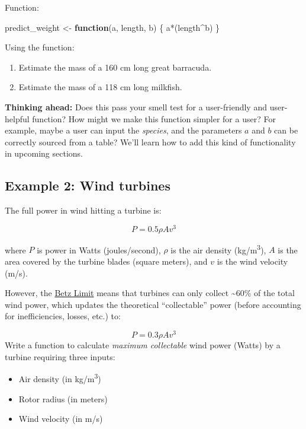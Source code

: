 \documentclass[
]{book}
\newenvironment{Shaded}{\begin{snugshade}}{\end{snugshade}}
\newcommand{\ControlFlowTok}[1]{\textcolor[rgb]{0.13,0.29,0.53}{\textbf{#1}}}
\newcommand{\NormalTok}[1]{#1}
\newcommand{\OtherTok}[1]{\textcolor[rgb]{0.56,0.35,0.01}{#1}}
\newcommand{\SpecialCharTok}[1]{\textcolor[rgb]{0.00,0.00,0.00}{#1}}
\providecommand{\tightlist}{%
  \setlength{\itemsep}{0pt}\setlength{\parskip}{0pt}}
\begin{document}
Function:

\begin{Shaded}
\begin{Highlighting}[]
\NormalTok{predict\_weight }\OtherTok{\textless{}{-}} \ControlFlowTok{function}\NormalTok{(a, length, b) \{}
\NormalTok{  a}\SpecialCharTok{*}\NormalTok{(length}\SpecialCharTok{\^{}}\NormalTok{b)}
\NormalTok{\}}
\end{Highlighting}
\end{Shaded}

Using the function:

\begin{enumerate}
\def\labelenumi{\arabic{enumi}.}
\tightlist
\item
  Estimate the mass of a 160 cm long great barracuda.
\item
  Estimate the mass of a 118 cm long milkfish.
\end{enumerate}

\textbf{Thinking ahead:} Does this pass your smell test for a user-friendly and user-helpful function? How might we make this function simpler for a user? For example, maybe a user can input the \emph{species}, and the parameters \(a\) and \(b\) can be correctly sourced from a table? We'll learn how to add this kind of functionality in upcoming sections.

\hypertarget{example-2-wind-turbines}{%
\subsection{Example 2: Wind turbines}\label{example-2-wind-turbines}}

The full power in wind hitting a turbine is:

\[P = 0.5\rho Av^3\]

where \(P\) is power in Watts (joules/second), \(\rho\) is the air density (kg/m\textsuperscript{3}), \(A\) is the area covered by the turbine blades (square meters), and \(v\) is the wind velocity (m/s).

However, the \href{https://energyeducation.ca/encyclopedia/Betz_limit}{Betz Limit} means that turbines can only collect \textasciitilde60\% of the total wind power, which updates the theoretical ``collectable'' power (before accounting for inefficiencies, losses, etc.) to:

\[P = 0.3\rho Av^3\]
Write a function to calculate \emph{maximum collectable} wind power (Watts) by a turbine requiring three inputs:

\begin{itemize}
\tightlist
\item
  Air density (in kg/m\textsuperscript{3})
\item
  Rotor radius (in meters)
\item
  Wind velocity (in m/s)
\end{itemize}
\end{document}
